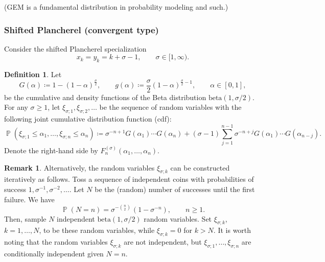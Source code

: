 \documentclass[letterpaper,11pt,oneside,reqno]{article}
\numberwithin{equation}{section}
\newcommand{\ssp}{\hspace{1pt}}
\theoremstyle{definition}
\newtheorem{definition}[proposition]{Definition}
\newtheorem{remark}[proposition]{Remark}
\begin{document}
(GEM is a fundamental distribution in probability modeling and such.)


\subsubsection{Shifted Plancherel (convergent type)}

Consider
the shifted Plancherel specialization
\begin{equation}
	\label{eq:shifted_Plancherel_specialization}
	x_k=y_k=k+\sigma-1,\qquad \sigma\in[1,\infty).
\end{equation}

\begin{definition}
	\label{def:xi_sigma}
	Let
	\begin{equation}
		\label{eq:beta_1_sigma_2_density}
		G(\alpha)\coloneqq 1-(1-\alpha)^{\frac{\sigma}{2}},\qquad
		g(\alpha)\coloneqq \frac{\sigma}{2}(1-\alpha)^{\frac{\sigma}{2}-1},
		\qquad
		\alpha\in [0,1],
	\end{equation}
	be the cumulative and density functions of the Beta distribution $\mathrm{beta}(1,\sigma/2)$.
	For any $\sigma\ge1$,
	let $\xi_{\sigma;1},\xi_{\sigma;2},\ldots $ be the sequence of random variables
	with the following joint cumulative distribution function (cdf):
	\begin{equation}
		\label{eq:joint_cdf}
		\operatorname{\mathbb{P}}
		\left( \xi_{\sigma;1}\le \alpha_1,\ldots,\xi_{\sigma;n}\le \alpha_n  \right)\coloneqq
		\sigma^{-n+1}G(\alpha_1)\cdots G(\alpha_n)
		+
		(\sigma-1)
		\sum_{j=1}^{n-1}\sigma^{-n+j}G(\alpha_1)\cdots G(\alpha_{n-j}).
	\end{equation}
	Denote the right-hand side by
	$F_n^{(\sigma)}(\alpha_1,\ldots,\alpha_n )$.
\end{definition}
\begin{remark}
	Alternatively, the random variables
	$\xi_{\sigma;k}$ can be constructed iteratively as follows.
	Toss a sequence of independent coins with probabilities of
	success $1,\sigma^{-1},\sigma^{-2},\ldots $.
	Let $N$ be the (random) number of successes until the first
	failure. We have
	\begin{equation}
		\operatorname{\mathbb{P}}(N=n)=\sigma^{-\binom n2}\ssp(1-\sigma^{-n}),\qquad n\ge1.
	\end{equation}
	Then, sample $N$ independent
	$\mathrm{beta}(1,\sigma/2)$ random variables.
	Set $\xi_{\sigma;k}$,
	$k=1,\ldots,N $, to be these random variables,
	while $\xi_{\sigma;k}=0$ for $k>N$.
	It is worth noting
	that the random variables $\xi_{\sigma;k}$ are not
	independent, but $\xi_{\sigma;1},\ldots,\xi_{\sigma;n} $
	are conditionally independent given $N=n$.
\end{remark}
\end{document}
